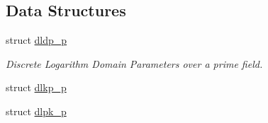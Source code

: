 \subsection*{Data Structures}
\begin{CompactItemize}
\item 
struct \hyperlink{structdldp__p}{dldp\_\-p}
\begin{CompactList}\small\item\em Discrete Logarithm Domain Parameters over a prime field. \item\end{CompactList}\item 
struct \hyperlink{structdlkp__p}{dlkp\_\-p}
\item 
struct \hyperlink{structdlpk__p}{dlpk\_\-p}
\end{CompactItemize}
